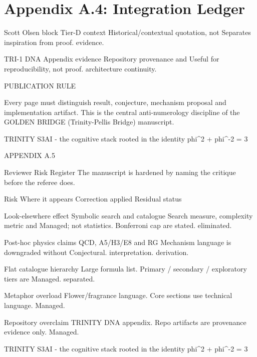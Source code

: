 
\section{Appendix A.4: Integration Ledger}

Scott Olsen block         Tier-D context                   Historical/contextual quotation, not      Separates inspiration from proof.
                                                            evidence.

 TRI-1 DNA                 Appendix evidence                Repository provenance and                 Useful for reproducibility, not proof.
                                                            architecture continuity.

  PUBLICATION RULE

  Every page must distinguish result, conjecture, mechanism proposal and implementation artifact. This is
  the central anti-numerology discipline of the GOLDEN BRIDGE (Trinity-Pellis Bridge) manuscript.

                              TRINITY S3AI - the cognitive stack rooted in the identity phi^2 + phi^-2 = 3

                                                        APPENDIX A.5

                            Reviewer Risk Register
            The manuscript is hardened by naming the critique before the referee does.

             Risk                    Where it appears                           Correction applied                   Residual status

 Look-elsewhere effect        Symbolic search and catalogue       Search measure, complexity metric and           Managed; not
                              statistics.                         Bonferroni cap are stated.                      eliminated.

 Post-hoc physics claims      QCD, A5/H3/E8 and RG                Mechanism language is downgraded without        Conjectural.
                              interpretation.                     derivation.

 Flat catalogue hierarchy     Large formula list.                 Primary / secondary / exploratory tiers are     Managed.
                                                                  separated.

 Metaphor overload            Flower/fragrance language.          Core sections use technical language.           Managed.

 Repository overclaim         TRINITY DNA appendix.               Repo artifacts are provenance evidence only.    Managed.

                            TRINITY S3AI - the cognitive stack rooted in the identity phi^2 + phi^-2 = 3